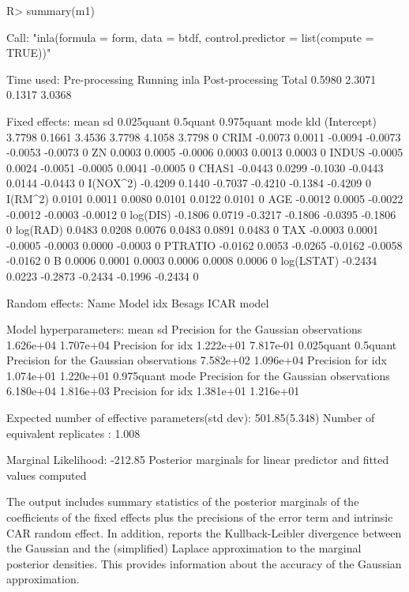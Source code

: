 \documentclass[article]{jss}
\begin{document}
\begin{Schunk}
\begin{Sinput}
R> summary(m1)
\end{Sinput}
\begin{Soutput}
Call:
"inla(formula = form, data = btdf, control.predictor = list(compute = TRUE))"

Time used:
 Pre-processing    Running inla Post-processing           Total 
         0.5980          2.3071          0.1317          3.0368 

Fixed effects:
               mean     sd 0.025quant 0.5quant 0.975quant    mode kld
(Intercept)  3.7798 0.1661     3.4536   3.7798     4.1058  3.7798   0
CRIM        -0.0073 0.0011    -0.0094  -0.0073    -0.0053 -0.0073   0
ZN           0.0003 0.0005    -0.0006   0.0003     0.0013  0.0003   0
INDUS       -0.0005 0.0024    -0.0051  -0.0005     0.0041 -0.0005   0
CHAS1       -0.0443 0.0299    -0.1030  -0.0443     0.0144 -0.0443   0
I(NOX^2)    -0.4209 0.1440    -0.7037  -0.4210    -0.1384 -0.4209   0
I(RM^2)      0.0101 0.0011     0.0080   0.0101     0.0122  0.0101   0
AGE         -0.0012 0.0005    -0.0022  -0.0012    -0.0003 -0.0012   0
log(DIS)    -0.1806 0.0719    -0.3217  -0.1806    -0.0395 -0.1806   0
log(RAD)     0.0483 0.0208     0.0076   0.0483     0.0891  0.0483   0
TAX         -0.0003 0.0001    -0.0005  -0.0003     0.0000 -0.0003   0
PTRATIO     -0.0162 0.0053    -0.0265  -0.0162    -0.0058 -0.0162   0
B            0.0006 0.0001     0.0003   0.0006     0.0008  0.0006   0
log(LSTAT)  -0.2434 0.0223    -0.2873  -0.2434    -0.1996 -0.2434   0

Random effects:
Name	  Model
 idx   Besags ICAR model 

Model hyperparameters:
                                        mean      sd       
Precision for the Gaussian observations 1.626e+04 1.707e+04
Precision for idx                       1.222e+01 7.817e-01
                                        0.025quant 0.5quant 
Precision for the Gaussian observations 7.582e+02  1.096e+04
Precision for idx                       1.074e+01  1.220e+01
                                        0.975quant mode     
Precision for the Gaussian observations 6.180e+04  1.816e+03
Precision for idx                       1.381e+01  1.216e+01

Expected number of effective parameters(std dev): 501.85(5.348)
Number of equivalent replicates : 1.008 

Marginal Likelihood:  -212.85 
Posterior marginals for linear predictor and fitted values computed
\end{Soutput}
\end{Schunk}
\noindent
The output includes summary statistics of the posterior marginals of the
coefficients of the fixed effects plus the precisions of the error term and
intrinsic CAR random effect. In addition,  reports the
Kullback-Leibler divergence between the Gaussian and the (simplified)
Laplace approximation to the marginal posterior densities. This provides
information about the accuracy of the Gaussian approximation. 
\end{document}
